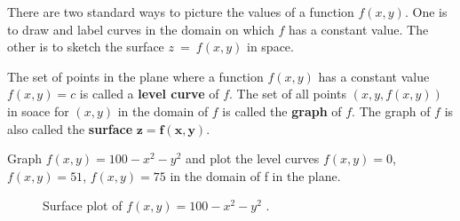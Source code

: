 \documentclass[12pt,a4paper]{article}
\newenvironment{definition}{\begin{definitionbox}}{\end{definitionbox}\vspace{1\baselineskip}}
\begin{document}
There are two standard ways to picture the values of a function \(f(x,y)\). One is to draw and label curves in the domain on which \(f\) has a constant value. The other is to sketch the surface \(z\ =\ f(x,y)\) in space.

\begin{definition}
    The set of points in the plane where a function \(f(x,y)\) has a constant value \(f(x,y) = c\) is called a \textbf{level curve} of \(f\).
    The set of all points \((x, y, f(x,y))\) in soace for \((x,y)\) in the domain of \(f\) is called the \textbf{graph} of \(f\).
    The graph of \(f\) is also called the \textbf{surface} \(\mathbf{z = f(x,y)}\).
\end{definition}

\newpage

\begin{example}
    Graph \(f(x,y) = 100 - x^2 - y^2\) and plot the level curves \(f(x,y) = 0\), \(f(x,y) = 51\), \(f(x,y) = 75\) in the domain of f in the plane.
    \begin{figure}[h]
        \centering

        \caption{Surface plot of $f(x,y) = 100 - x^2 - y^2$ .}
        \label{fig:surfaceplot}
    \end{figure}

\end{example}
\end{document}
